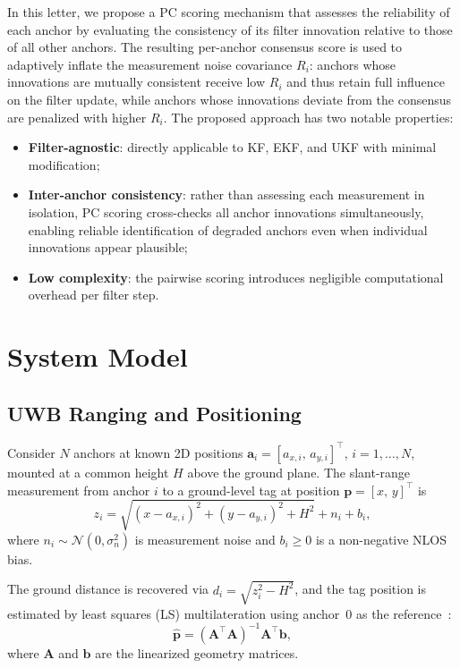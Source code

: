 \documentclass[journal]{IEEEtran}
\newcommand{\mbf}[1]{\mathbf{#1}}
\begin{document}
In this letter, we propose a PC scoring mechanism that assesses the reliability of each anchor by evaluating the consistency of its filter innovation relative to those of all other anchors. The resulting per-anchor consensus score is used to adaptively inflate the measurement noise covariance $R_i$: anchors whose innovations are mutually consistent receive low $R_i$ and thus retain full influence on the filter update, while anchors whose innovations deviate from the consensus are penalized with higher $R_i$. The proposed approach has two notable properties:
\begin{itemize}
    \item \textbf{Filter-agnostic}: directly applicable to KF, EKF, and UKF with minimal modification;
    \item \textbf{Inter-anchor consistency}: rather than assessing each measurement in isolation, PC scoring cross-checks all anchor innovations simultaneously, enabling reliable identification of degraded anchors even when individual innovations appear plausible;
    \item \textbf{Low complexity}: the pairwise scoring introduces negligible computational overhead per filter step.
\end{itemize}


\section{System Model}

\subsection{UWB Ranging and Positioning}

Consider $N$ anchors at known 2D positions $\mbf{a}_i = [a_{x,i},\, a_{y,i}]^\top$, $i=1,\ldots,N$, mounted at a common height $H$ above the ground plane. The slant-range measurement from anchor $i$ to a ground-level tag at position $\mbf{p} = [x,\, y]^\top$ is
\begin{equation}\label{eq:range}
    z_i = \sqrt{(x - a_{x,i})^2 + (y - a_{y,i})^2 + H^2} + n_i + b_i,
\end{equation}
where $n_i \sim \mathcal{N}(0, \sigma_n^2)$ is measurement noise and $b_i \geq 0$ is a non-negative NLOS bias.

The ground distance is recovered via $d_i = \sqrt{z_i^2 - H^2}$, and the tag position is estimated by least squares (LS) multilateration using anchor~$0$ as the reference~\cite{ls_trilateration}:
\begin{equation}\label{eq:ls}
    \hat{\mbf{p}} = (\mbf{A}^\top \mbf{A})^{-1} \mbf{A}^\top \mbf{b},
\end{equation}
where $\mbf{A}$ and $\mbf{b}$ are the linearized geometry matrices.
\end{document}
